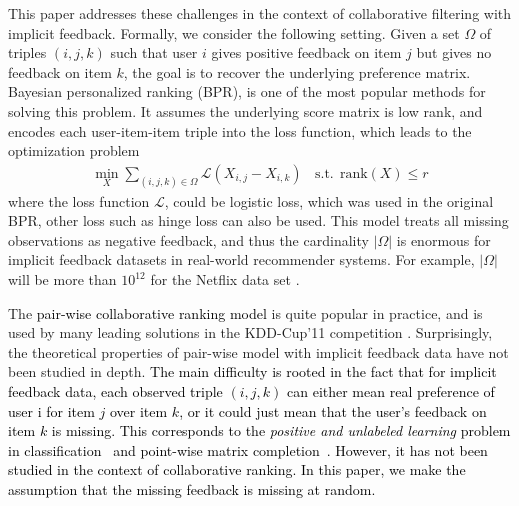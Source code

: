 \documentclass{article}
\numberwithin{equation}{section}
\newcommand{\laks}[1]{\textcolor{black}{#1}}
\newtheorem{sampling strategy}{Sampling Strategy}
\begin{document}
This paper addresses these challenges in the context of collaborative filtering with implicit feedback. Formally, we consider the following setting. Given
a set $\Omega$ of triples $(i,j,k)$ such that user $i$ gives positive feedback on item $j$ but gives no feedback on item $k$,
the goal is to recover the underlying preference matrix. 
Bayesian personalized ranking (BPR),  \cite{bpr} is one of the most popular methods for solving this problem. It assumes the underlying score matrix is low rank, and encodes each user-item-item triple into the loss function, which leads to the optimization problem
\begin{equation*}
    \begin{array}{ll}
       \displaystyle \min_X  \sum_{(i,j,k) \in \Omega} \mathcal{L}( {X}_{i,j} - {X}_{i,k} ) ~~~~ \text{s.t.}~~  \text{rank}(X) \leq r
    \end{array}
\end{equation*}
where the loss function $\mathcal{L}$, could be logistic loss, which was used in the original BPR, other loss such as hinge loss can also be used.
This model treats all missing observations as negative feedback, and thus the cardinality $|\Omega|$ is enormous for implicit feedback datasets in real-world recommender systems. For example, $|\Omega|$ will be more than {$10^{12}$} for the Netflix data set \cite{netflix}. 

The \laks{pair-wise collaborative ranking model} is quite popular in practice, and is used by many leading solutions in the KDD-Cup'11 competition \cite{yahoo!}. Surprisingly, the theoretical properties of pair-wise model with implicit feedback data have  not been  studied in depth. \laks{The main difficulty is rooted in the fact that for implicit feedback data, each observed triple $(i, j, k)$ can either mean  real  preference of user i for item $j$ over item $k$, or it could just mean that the user's feedback on item $k$ is missing. This corresponds to the \textit{positive and unlabeled learning} problem in classification~\cite{elkan2008learning} and point-wise matrix completion~\cite{hsieh2015pu}. However, it has not been studied in the context of collaborative ranking. In this paper, we make the assumption that the missing feedback is missing at random.} 
\end{document}
